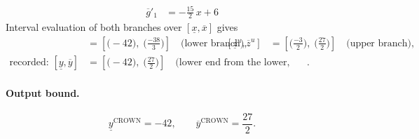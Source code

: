 \documentclass[11pt]{article}
\begin{document}
\begin{align*}
\overline{g}'_{1} &= -\frac{15}{2}\,x + 6
\end{align*}
Interval evaluation of both branches over $[\underline{x}, \overline{x}]$ gives
\begin{align*}
[\underline{z}^{\ell}, \overline{z}^{\ell}] &= [\bigl(-42\bigr),\; \bigl(\frac{-38}{3}\bigr)] \quad\text{(lower branch)}, & [\underline{z}^{u}, \overline{z}^{u}] &= [\bigl(\frac{-3}{2}\bigr),\; \bigl(\frac{27}{2}\bigr)] \quad\text{(upper branch)}, \\
\text{recorded: } [\underline{y}, \overline{y}] &= [\bigl(-42\bigr),\; \bigl(\frac{27}{2}\bigr)] \quad\text{(lower end from the lower, upper end from the upper branch)}.
\end{align*}
\paragraph{Output bound.}
\begin{equation*}
\underline{y}^{\text{CROWN}} = -42, \qquad \overline{y}^{\text{CROWN}} = \frac{27}{2}.
\end{equation*}
\end{document}
